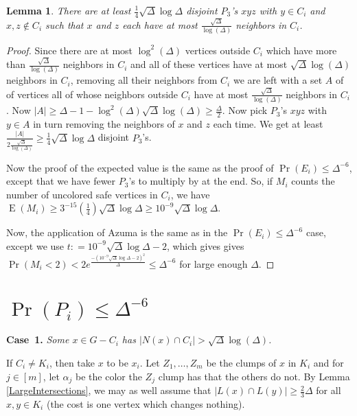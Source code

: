 \documentclass[12pt]{amsart}
\theoremstyle{plain}
\newtheorem{lem}[thm]{Lemma}
\theoremstyle{definition}
\theoremstyle{remark}
\newcommand{\card}[1]{\left|#1\right|}
\newcommand{\irange}[1]{\left[#1\right]}
\newcommand{\DefinedAs}{\mathrel{\mathop:}=}
\newcommand{\ex}{\operatorname{E}}
\begin{document}
\begin{lem}\label{triplesAgain}
There are at least $\frac14 \sqrt{\Delta}\log{\Delta}$ disjoint $P_3$'s $xyz$
with $y \in C_i$ and $x, z \not \in C_i$ such that $x$ and $z$ each have at most
$\frac{\sqrt{\Delta}}{\log(\Delta)}$ neighbors in $C_i$.
\end{lem}
\begin{proof}
Since there are at most $\log^2(\Delta)$ vertices outside $C_i$ which have more
than $\frac{\sqrt{\Delta}}{\log(\Delta)}$ neighbors in $C_i$ and all of these
vertices have at most $\sqrt{\Delta}\log(\Delta)$ neighbors in $C_i$, removing
all their neighbors from $C_i$ we are left with a set $A$ of of vertices all of
whose neighbors outside $C_i$ have at most $\frac{\sqrt{\Delta}}{\log(\Delta)}$
neighbors in $C_i$.  Now $\card{A} \geq \Delta - 1 -
\log^2(\Delta)\sqrt{\Delta}\log(\Delta) \geq \frac{\Delta}{2}$.  Now pick
$P_3$'s $xyz$ with $y \in A$ in turn removing the neighbors of $x$ and $z$ each
time.  We get at least $\frac{\card{A}}{2\frac{\sqrt{\Delta}}{\log(\Delta)}}
\geq \frac14 \sqrt{\Delta}\log{\Delta}$ disjoint $P_3$'s.

Now the proof of the expected value is the same as the proof of $\Pr(E_i) \leq
\Delta^{-6}$, except that we have fewer $P_3$'s to multiply by at the end.  So,
if $M_i$ counts the number of uncolored safe vertices in $C_i$, we have
$\ex(M_i) \geq 3^{-15} (\frac14) \sqrt{\Delta}\log{\Delta} \geq 10^{-9}
\sqrt{\Delta}\log{\Delta}$.

Now, the application of Azuma is the same as in the $\Pr(E_i) \leq
\Delta^{-6}$ case, except we use $t \DefinedAs 10^{-9}
\sqrt{\Delta}\log{\Delta} - 2$, which gives gives $\Pr(M_i < 2) <
2e^{\frac{-(10^{-9} \sqrt{\Delta}\log{\Delta} - 2)^2}{\Delta}} \leq
\Delta^{-6}$ for large enough $\Delta$.
\end{proof}

\section{$\Pr(P_i) \leq \Delta^{-6}$}
{\bf Case~1.} {\it Some $x \in G  - C_i$ has $\card{N(x) \cap C_i} >
\sqrt{\Delta}\log(\Delta)$.} 

If $C_i \neq K_i$, then take $x$ to be $x_i$. Let $Z_1, \ldots, Z_m$ be the
clumps of $x$ in $K_i$ and for $j \in \irange{m}$, let $\alpha_j$ be the color
the $Z_j$ clump has that the others do not.  By Lemma \ref{LargeIntersections}, we may as well assume that $\card{L(x) \cap
L(y)} \geq \frac23 \Delta$ for all $x,y \in K_i$ (the cost is one vertex which
changes nothing).
\end{document}
